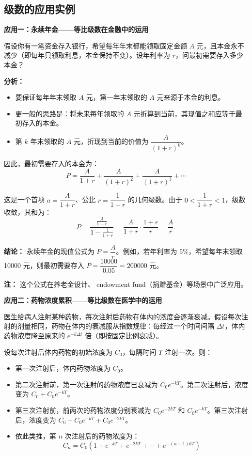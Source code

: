 \documentclass{ctexart}
\newenvironment{custom}[1]{\par\noindent \textbf{#1}\quad}{\par\vspace{1em}}
\begin{document}
\begin{example}[加减结构中的错误示例]
\subsection{级数的应用实例}

\begin{custom}{应用一：永续年金——等比级数在金融中的运用}

假设你有一笔资金存入银行，希望每年年末都能领取固定金额 \(A\) 元，且本金永不减少（即每年只领取利息，本金保持不变）。设年利率为 \(r\)，问最初需要存入多少本金？

\textbf{分析：}
\begin{itemize}
\item 要保证每年年末领取 \(A\) 元，第一年末领取的 \(A\) 元来源于本金的利息。
\item 更一般的思路是：将未来每年领取的 \(A\) 元折算到当前，其现值之和应等于最初存入的本金。
\item 第 \(k\) 年末领取的 \(A\) 元，折现到当前的价值为 \(\dfrac{A}{(1+r)^k}\)。
\end{itemize}

因此，最初需要存入的本金为：
\[
P = \frac{A}{1+r} + \frac{A}{(1+r)^2} + \frac{A}{(1+r)^3} + \cdots
\]

这是一个首项 \(a = \dfrac{A}{1+r}\)、公比 \(r = \dfrac{1}{1+r}\) 的几何级数。由于 \(0 < \dfrac{1}{1+r} < 1\)，级数收敛，其和为：
\[
P = \frac{\frac{A}{1+r}}{1 - \frac{1}{1+r}} = \frac{A}{1+r} \cdot \frac{1+r}{r} = \frac{A}{r}.
\]

\textbf{结论：} 永续年金的现值公式为 \(P = \dfrac{A}{r}\)。例如，若年利率为 \(5\%\)，希望每年末领取 10000 元，则最初需要存入 \(P = \dfrac{10000}{0.05} = 200000\) 元。

\textbf{注：} 这个公式在养老金设计、 endowment fund（捐赠基金）等场景中广泛应用。
\end{custom}

\begin{custom}{应用二：药物浓度累积——等比级数在医学中的运用}

医生给病人注射某种药物，每次注射后药物在体内的浓度会逐渐衰减。假设每次注射的剂量相同，药物在体内的衰减服从指数规律：每经过一个时间间隔 \(\Delta t\)，体内药物浓度降至原来的 \(e^{-k\Delta t}\) 倍（即按固定比例衰减）。

设每次注射后体内药物的初始浓度为 \(C_0\)，每隔时间 \(T\) 注射一次。则：
\begin{itemize}
\item 第一次注射后，体内药物浓度为 \(C_0\)。
\item 第二次注射前，第一次注射的药物浓度已衰减为 \(C_0 e^{-kT}\)。第二次注射后，浓度变为 \(C_0 + C_0 e^{-kT}\)。
\item 第三次注射前，前两次的药物浓度分别衰减为 \(C_0 e^{-2kT}\) 和 \(C_0 e^{-kT}\)。第三次注射后，浓度变为 \(C_0 + C_0 e^{-kT} + C_0 e^{-2kT}\)。
\item 依此类推，第 \(n\) 次注射后的药物浓度为：
\[
C_n = C_0 \left(1 + e^{-kT} + e^{-2kT} + \cdots + e^{-(n-1)kT}\right)
\]
\end{itemize}


\end{custom}
\end{example}
\end{document}
